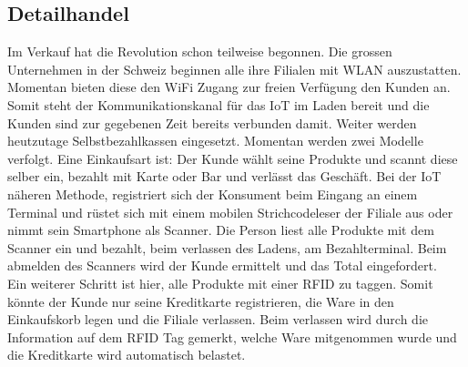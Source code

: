 \newpage

\subsection{Detailhandel}
Im Verkauf hat die Revolution schon teilweise begonnen. Die grossen Unternehmen in der Schweiz beginnen alle ihre Filialen mit \gls{WLAN} auszustatten. Momentan bieten diese den \gls{WiFi} Zugang zur freien Verfügung den Kunden an. Somit steht der Kommunikationskanal für das \gls{IoT} im Laden bereit und die Kunden sind zur gegebenen Zeit bereits verbunden damit.
Weiter werden heutzutage Selbstbezahlkassen eingesetzt. Momentan werden zwei Modelle verfolgt. Eine Einkaufsart ist: Der Kunde wählt seine Produkte und scannt diese selber ein, bezahlt mit Karte oder Bar und verlässt das Geschäft. Bei der \gls{IoT} näheren Methode, registriert sich der Konsument beim Eingang an einem Terminal und rüstet sich mit einem mobilen Strichcodeleser der Filiale aus oder nimmt sein Smartphone als Scanner. Die Person liest alle Produkte mit dem Scanner ein und bezahlt, beim verlassen des Ladens, am Bezahlterminal. Beim abmelden des Scanners wird der Kunde ermittelt und das Total eingefordert.\\
Ein weiterer Schritt ist hier, alle Produkte mit einer \gls{RFID} zu taggen. Somit könnte der Kunde nur seine Kreditkarte registrieren, die Ware in den Einkaufskorb legen und die Filiale verlassen. Beim verlassen wird durch die Information auf dem \gls{RFID} Tag gemerkt, welche Ware mitgenommen wurde und die Kreditkarte wird automatisch belastet.


